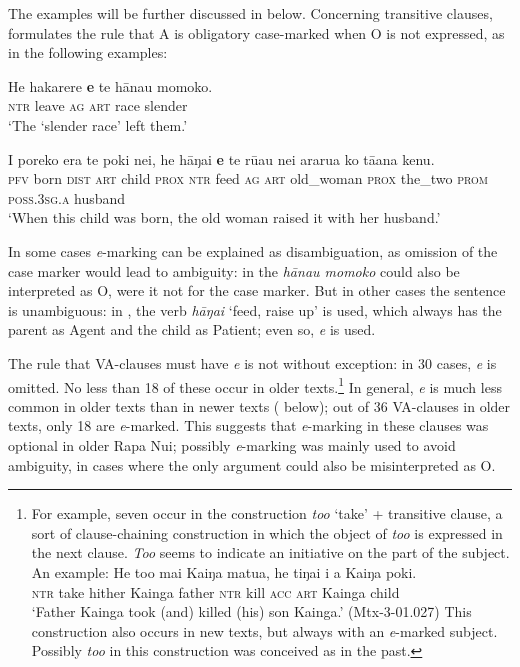 The  examples will be further discussed in  below. Concerning transitive clauses, \citet{WeberN2003} formulates the rule that A is obligatory case-marked when O is not expressed, as in the following examples:

\ea\label{ex:8.11}
\gll He hakarere \textbf{e} te hānau momoko. \\
\textsc{ntr} leave \textsc{ag} \textsc{art} race slender \\

\glt 
‘The ‘slender race’ left them.’ \textstyleExampleref{[Ley-3-06.044]}
\z

\ea\label{ex:8.12}
\gll I poreko era te poki nei, he hāŋai \textbf{e} te rū{\ꞌ}au nei ararua ko tā{\ꞌ}ana kenu.\\
\textsc{pfv} born \textsc{dist} \textsc{art} child \textsc{prox} \textsc{ntr} feed \textsc{ag} \textsc{art} old\_woman \textsc{prox} the\_two \textsc{prom} \textsc{poss.3sg.a} husband\\

\glt
‘When this child was born, the old woman raised it with her husband.’ \textstyleExampleref{[R352.005]} 
\z

In some cases \textit{e}{}-marking can be explained as disambiguation, as omission of the case marker would lead to ambiguity: in  the \textit{hānau momoko} could also be interpreted as O, were it not for the case marker. But in other cases the sentence is unambiguous: in , the verb \textit{hāŋai} ‘feed, raise up’ is used, which always has the parent as Agent and the child as Patient; even so, \textit{e} is used. 

The rule that VA-clauses must have \textit{e} is not without exception: in 30 cases, \textit{e} is omitted. No less than 18 of these occur in older texts.\footnote{\label{fn:391}For example, seven occur in the construction \textit{to{\ꞌ}o} ‘take’ + transitive clause, a sort of clause-chaining construction in which the object of \textit{to{\ꞌ}o} is expressed in the next clause. \textit{To{\ꞌ}o} seems to indicate an initiative on the part of the subject. An example:
\ea
\gll  He to{\ꞌ}o mai Kaiŋa matu{\ꞌ}a, he tiŋa{\ꞌ}i i a Kaiŋa poki.\\
  \textsc{ntr} take hither Kainga father \textsc{ntr} kill \textsc{acc} \textsc{art} Kainga child\\
  \glt 
  ‘Father Kainga took (and) killed (his) son Kainga.’ (Mtx-3-01.027)
  \z
This construction also occurs in new texts, but always with an \textit{e}{}-marked subject. Possibly \textit{to{\ꞌ}o} in this construction was conceived as  in the past.} In general, \textit{e} is much less common in older texts than in newer texts ( below); out of 36 VA\nobreakdash-clauses in older texts, only 18 are \textit{e}{}-marked. This suggests that \textit{e}{}-marking in these clauses was optional in older Rapa Nui; possibly \textit{e}{}-marking was mainly used to avoid ambiguity, in cases where the only argument could also be misinterpreted as O. 

